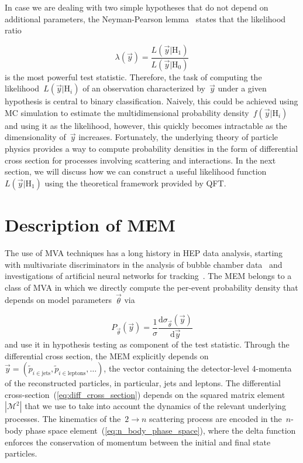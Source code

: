 In case we are dealing with two simple hypotheses that do not depend on additional parameters, the Neyman-Pearson lemma~\cite{neyman1992problem} states that the likelihood ratio

\begin{equation}
\lambda(\vec{y}) = \frac{L(\vec{y}|\mathrm{H}_1)}{L(\vec{y}|\mathrm{H}_0)}
\end{equation}
is the most powerful test statistic. Therefore, the task of computing the likelihood~$L(\vec{y}|\mathrm{H}_i)$ of an observation characterized by~$\vec{y}$ under a given hypothesis is central to binary classification. Naively, this could be achieved using MC simulation to estimate the multidimensional probability density~$f(\vec{y}|\mathrm{H}_i)$ and using it as the likelihood, however, this quickly becomes intractable as the dimensionality of~$\vec{y}$ increases. Fortunately, the underlying theory of particle physics provides a way to compute probability densities in the form of differential cross section for processes involving scattering and interactions. In the next section, we will discuss how we can construct a useful likelihood function~$L(\vec{y}|\mathrm{H}_1)$ using the theoretical framework provided by QFT.

\section{Description of MEM}

The use of MVA techniques has a long history in HEP data analysis, starting with multivariate discriminators in the analysis of bubble chamber data~\cite{VanDoninck:1984wd} and investigations of artificial neural networks for tracking~\cite{Denby:1987rk}. The MEM belongs to a class of MVA in which we directly compute the per-event probability density that depends on model parameters~$\vec{\theta}$ via

\begin{equation}
P_{\vec{\theta}}(\vec{y}) = \frac{1}{\sigma}
\frac{\mathrm{d}\sigma_{\vec{\theta}}(\vec{y})}{\mathrm{d}\vec{y}}
\end{equation}
and use it in hypothesis testing as component of the test statistic. Through the differential cross section, the MEM explicitly depends on~$\vec{y} = (\tilde{p}_{i \in \mathrm{jets}}, \tilde{p}_{i \in \mathrm{leptons}}, \dots)$, the vector containing the detector-level 4-momenta of the reconstructed particles, in particular, jets and leptons. The differential cross-section~(\cref{eq:diff_cross_section}) depends on the squared matrix element~$|\mathcal{M}^2|$ that we use to take into account the dynamics of the relevant underlying processes. The kinematics of the~$2 \rightarrow n$ scattering process are encoded in the~$n$-body phase space element~(\cref{eq:n_body_phase_space}), where the delta function enforces the conservation of momentum between the initial and final state particles.

